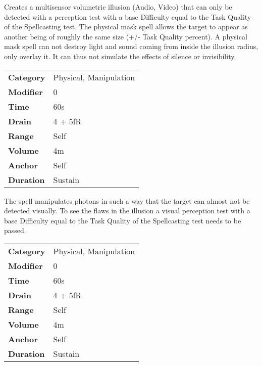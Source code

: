 \hfil

Creates a multisensor volumetric illusion (Audio, Video) that
can only be detected with a perception test with a base Difficulty equal
to the Task Quality of the
Spellcasting test. The physical mask spell
allows the target to appear as another being of roughly the same size
(+/- Task Quality percent). A physical mask
spell can not destroy light and sound coming from inside the illusion
radius, only overlay it. It can thus not simulate the effects of silence
or invisibility.


\begin{tabular}{ll}
    \textbf{Category} & Physical, Manipulation \\
    \textbf{Modifier} & 0                      \\
    \textbf{Time}     & 60s                    \\
    \textbf{Drain}    & 4 + 5fR                \\
    \textbf{Range}    & Self                   \\
    \textbf{Volume}   & 4m                     \\
    \textbf{Anchor}   & Self                   \\
    \textbf{Duration} & Sustain                \\
\end{tabular}

\hfil

The spell manipulates photons in such a way that the target can
almost not be detected visually. To see the flaws in the illusion a
visual perception test with a base Difficulty equal to the Task
Quality of the
Spellcasting test needs to be passed.



\begin{tabular}{ll}
    \textbf{Category} & Physical, Manipulation \\
    \textbf{Modifier} & 0                      \\
    \textbf{Time}     & 60s                    \\
    \textbf{Drain}    & 4 + 5fR                \\
    \textbf{Range}    & Self                   \\
    \textbf{Volume}   & 4m                     \\
    \textbf{Anchor}   & Self                   \\
    \textbf{Duration} & Sustain                \\
\end{tabular}

